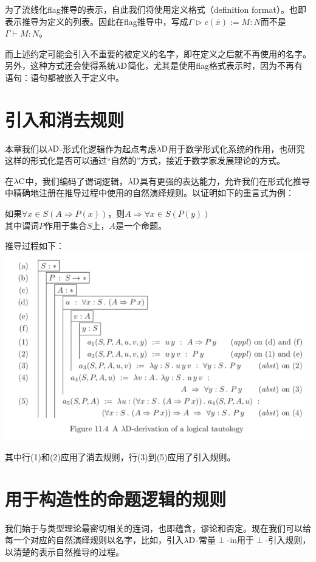 \documentclass[UTF8]{article}
\begin{document}
		为了流线化flag推导的表示，自此我们将使用定义格式（definition format）。也即表示推导为定义的列表。因此在flag推导中，写成$\Gamma\triangleright c(\overline{x}):=M:N$而不是$\Gamma\vdash M:N$。
		
		而上述约定可能会引入不重要的被定义的名字，即在定义之后就不再使用的名字。另外，这种方式还会使得系统$\lambda{\rm D}$简化，尤其是使用flag格式表示时，因为不再有语句：语句都被嵌入于定义中。
		
	\section{引入和消去规则}
	\noindent
	本章我们以$\lambda{\rm D}$-形式化逻辑作为起点考虑$\lambda{\rm D}$用于数学形式化系统的作用，也研究这样的形式化是否可以通过“自然的”方式，接近于数学家发展理论的方式。
	
		在$\lambda{\rm C}$中，我们编码了谓词逻辑，$\lambda{\rm D}$具有更强的表达能力，允许我们在形式化推导中精确地注册在推导过程中使用的自然演绎规则。以证明如下的重言式为例：
		
		如果$\forall{x\in S}(A\Rightarrow P(x))$，则$A\Rightarrow\forall{x\in S}(P(y))$\\
		其中谓词$P$作用于集合$S$上，$A$是一个命题。
		
		推导过程如下：\\
		\includegraphics[width=0.93\linewidth]{"../imgs/11-5.png"}
		
		其中行(1)和(2)应用了消去规则，行(3)到(5)应用了引入规则。
		
	\section{用于构造性的命题逻辑的规则}
	\noindent
	我们始于与类型理论最密切相关的连词，也即蕴含，谬论和否定。现在我们可以给每一个对应的自然演绎规则以名字，比如，引入$\lambda{\rm D}$-常量$\perp$-in用于$\perp$-引入规则，以清楚的表示自然推导的过程。
		
\end{document}

